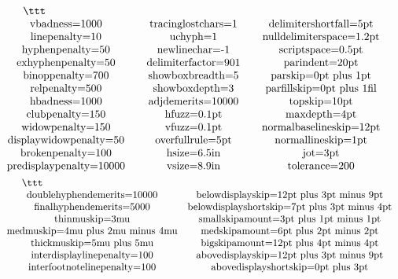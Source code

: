 $$\vbox{\ttt \halign{#\hfil\qquad&&#\hfil\qquad\cr
\\vbadness=1000&\\tracinglostchars=1&\\delimitershortfall=5pt\cr
\\linepenalty=10&\\uchyph=1&\\nulldelimiterspace=1.2pt\cr
\\hyphenpenalty=50&\\newlinechar=-1&\\scriptspace=0.5pt\cr
\\exhyphenpenalty=50&\\delimiterfactor=901&\\parindent=20pt\cr
\\binoppenalty=700&\\showboxbreadth=5&\\parskip=0pt plus 1pt\cr
\\relpenalty=500&\\showboxdepth=3&\\parfillskip=0pt plus 1fil\cr
\\hbadness=1000&\\adjdemerits=10000&\\topskip=10pt\cr
\\clubpenalty=150&\\hfuzz=0.1pt&\\maxdepth=4pt\cr
\\widowpenalty=150&\\vfuzz=0.1pt&\\normalbaselineskip=12pt\cr
\\displaywidowpenalty=50&\\overfullrule=5pt&\\normallineskip=1pt\cr
\\brokenpenalty=100&\\hsize=6.5in&\\jot=3pt\cr
\\predisplaypenalty=10000&\\vsize=8.9in&\\tolerance=200\cr}}$$
$$\vbox{\ttt \halign{#\hfil\quad&&#\hfil\quad\cr
\\doublehyphendemerits=10000&\\belowdisplayskip=12pt plus 3pt minus 9pt\cr
\\finalhyphendemerits=5000&\\belowdisplayshortskip=7pt plus 3pt minus 4pt\cr
\\thinmuskip=3mu&\\smallskipamount=3pt plus 1pt minus 1pt\cr
\\medmuskip=4mu plus 2mu minus 4mu&\\medskipamount=6pt plus 2pt minus 2pt\cr
\\thickmuskip=5mu plus 5mu&\\bigskipamount=12pt plus 4pt minus 4pt\cr
\\interdisplaylinepenalty=100&\\abovedisplayskip=12pt plus 3pt minus 9pt\cr
\\interfootnotelinepenalty=100&\\abovedisplayshortskip=0pt plus 3pt\cr}}$$
